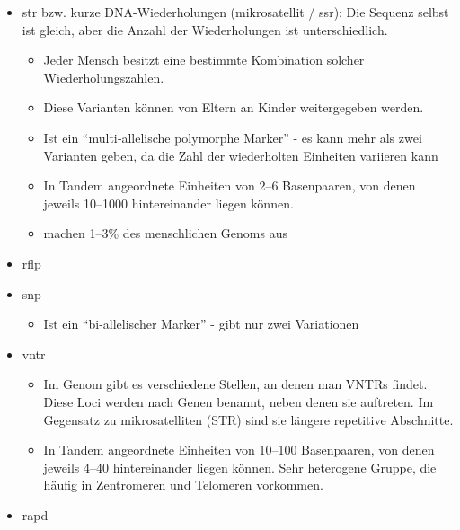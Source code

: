\begin{itemize}
    \item \gls{str} bzw.
    kurze DNA-Wiederholungen (\gls{mikrosatellit} / \gls{ssr}): Die Sequenz selbst ist gleich,
    aber die Anzahl der Wiederholungen ist unterschiedlich.
    \begin{itemize}
        \item Jeder Mensch besitzt eine bestimmte Kombination solcher Wiederholungszahlen.
        \item Diese Varianten können von Eltern an Kinder weitergegeben werden.
        \item Ist ein ``multi‐allelische polymorphe Marker'' - es kann mehr als zwei Varianten geben, da die Zahl
        der wiederholten Einheiten variieren kann~\cite{Knust2025_Modellorganismen}
        \item In Tandem angeordnete Einheiten von 2–6 Basenpaaren, von denen jeweils 10–1000 hintereinander liegen
        können. \cite{Knust2025_Genom_Eukaryontenzelle}
        \item  machen 1–3\% des menschlichen Genoms aus~\cite{Knust2025_Genom_Eukaryontenzelle}
    \end{itemize}
    \item \gls{rflp}
    \item \gls{snp}
    \begin{itemize}
        \item Ist ein ``bi‑allelischer Marker'' - gibt nur zwei Variationen
    \end{itemize}
    \item \gls{vntr}
    \begin{itemize}
        \item Im Genom gibt es verschiedene Stellen, an denen man VNTRs findet.
        Diese Loci werden nach Genen
        benannt, neben denen sie auftreten.
        Im Gegensatz zu \gls{mikrosatellit}en (STR) sind sie längere repetitive
        Abschnitte. \cite{dewiki:marker}
        \item In Tandem angeordnete Einheiten von 10–100 Basenpaaren, von denen jeweils 4–40 hintereinander liegen
        können.
        Sehr heterogene Gruppe, die häufig in Zentromeren und Telomeren vorkommen. \cite{Knust2025_Genom_Eukaryontenzelle}
    \end{itemize}
    \item \gls{rapd}
\end{itemize}



